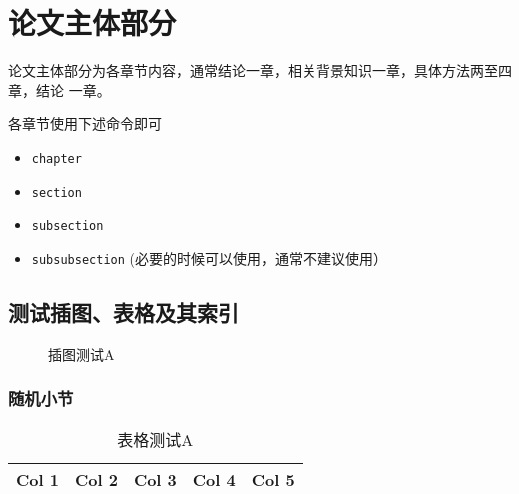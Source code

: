 
\chapter{论文主体部分}
\label{cha:mainmatter}

论文主体部分为各章节内容，通常结论一章，相关背景知识一章，具体方法两至四章，结论
一章。

各章节使用下述命令即可
\begin{itemize}
\item \texttt{chapter}
\item \texttt{section}
\item \texttt{subsection}
\item \texttt{subsubsection} (必要的时候可以使用，通常不建议使用）
\end{itemize}


\section{测试插图、表格及其索引}
\label{sec:testing}

\begin{figure}
  \centering
  
  \caption{插图测试A}
  \label{fig:test:a}
\end{figure}

\subsection{随机小节}
\label{sec:random-tf}

\begin{table}
  \centering
  \begin{tabular}{ccccc}
    \hline
    Col 1 & Col 2 & Col 3 & Col 4 & Col 5\\
    \hline
  \end{tabular}
  \caption{表格测试A}
  \label{tab:test}
\end{table}


